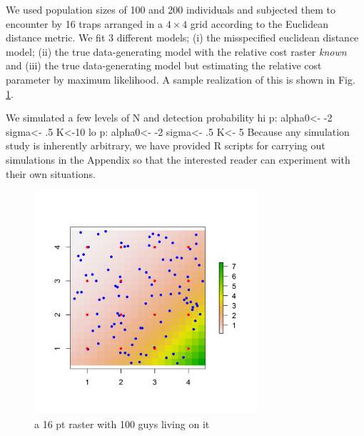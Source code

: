 We used population sizes of 100 and 200 individuals and subjected them
to encounter by 16 traps arranged in a $4\times 4$ grid according to
the Euclidean distance metric. We fit 3 different models; (i) the
misspecified euclidean distance model; (ii) the true data-generating
model with the relative cost raster {\it known} and (iii) the true
data-generating model but estimating the relative cost parameter by
maximum likelihood.  A sample realization of this is shown in Fig.
\ref{ecoldist.fig.raster100}.

We simulated a few levels of N and detection probability 
hi p: alpha0<- -2     sigma<- .5    K<-10
lo p: alpha0<- -2     sigma<- .5    K<- 5
Because any simulation study is inherently arbitrary, we have provided R scripts
for carrying out simulations in the Appendix so that the interested reader can experiment with
their own situations.

\begin{figure}
\begin{center}
\includegraphics[height=3.25in,width=3.25in]{Ch10/figs/raster_withN100}
\end{center}
\caption{a 16 pt raster with 100 guys living on it}
\label{ecoldist.fig.raster100}
\end{figure}
 
































